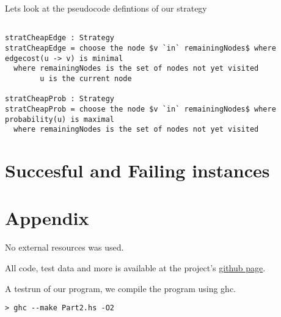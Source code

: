 \documentclass[a4paper,11pt]{article}
\begin{document}
Lets look at the pseudocode defintions of our strategy

\begin{lstlisting}[mathescape]

stratCheapEdge : Strategy
stratCheapEdge = choose the node $v `in` remainingNodes$ where edgecost(u -> v) is minimal
  where remainingNodes is the set of nodes not yet visited
        u is the current node

stratCheapProb : Strategy
stratCheapProb = choose the node $v `in` remainingNodes$ where probability(u) is maximal
  where remainingNodes is the set of nodes not yet visited

\end{lstlisting}

\section{Succesful and Failing instances}

\section{Appendix}
No external resources was used.

All code, test data and more is available at the project's \href{https://github.com/bisforboman/Algorithms-TIN092}{github page}.

A testrun of our program, we compile the program using ghc.

\begin{lstlisting}
> ghc --make Part2.hs -O2

\end{lstlisting}
\end{document}

